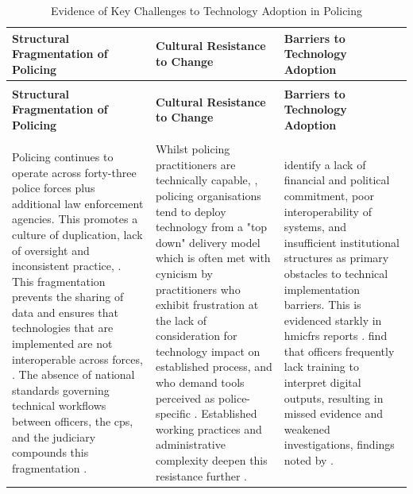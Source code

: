 \documentclass[12pt,a4paper,oneside]{report}
\begin{document}
\begin{longtable}{%
  >{\RaggedRight\arraybackslash}p{5.0cm}%
  >{\RaggedRight\arraybackslash}p{5.0cm}%
  >{\RaggedRight\arraybackslash}p{5.0cm}%
}
\caption{Evidence of Key Challenges to Technology Adoption in Policing}
\label{tab:policing-challenges}\\
\toprule
\textbf{Structural Fragmentation of Policing} &
\textbf{Cultural Resistance to Change} &
\textbf{Barriers to Technology Adoption} \\
\midrule
\endfirsthead
\multicolumn{3}{l}{\textit{Table~\ref{tab:policing-challenges} continued}}\\[4pt]
\toprule
\textbf{Structural Fragmentation of Policing} &
\textbf{Cultural Resistance to Change} &
\textbf{Barriers to Technology Adoption} \\
\midrule
\endhead
\midrule
\multicolumn{3}{r}{\textit{Continued on next page}}\\
\endfoot
\bottomrule
\endlastfoot
Policing continues to operate across forty-three police forces plus additional law enforcement agencies.  This promotes a culture of duplication, lack of oversight and inconsistent practice, \citep{halford2025transformer,casey2025gbcse,homeoffice2024reform}.
This fragmentation prevents the sharing of data and ensures that technologies that are implemented are not interoperable across forces, \citep{laufs2022technological}.  The absence of national standards governing technical workflows between officers, the \gls{cps}, and the judiciary compounds this fragmentation \citep{ng2025ronin}. &

Whilst policing practitioners are technically capable, \citep{laufs2022technological}, policing organisations tend to deploy technology from a "top down" delivery model which is often met with cynicism by practitioners who exhibit frustration at the lack of consideration for technology impact on established process, \citep{laufs2022technological,ratcliffe2020conflicts} and who demand tools perceived as police-specific \citep{halford2025transformer}. Established working practices and administrative complexity deepen this resistance further \citep{dubravova2024artificial}. &

\citet{laufs2022technological} identify a lack of financial and political commitment, poor interoperability of systems, and insufficient institutional structures as primary obstacles to technical implementation barriers.  This is evidenced starkly in \gls{hmicfrs} reports \citet{hmicfrs2025ndec,hmicfrs2026nca}.  \citet{ng2025ronin} find that officers frequently lack training to interpret digital outputs, resulting in missed evidence and weakened investigations, findings noted by \citet{thompson2021missed,casey2025gbcse}. \\
\end{longtable}
\endgroup
\end{document}
